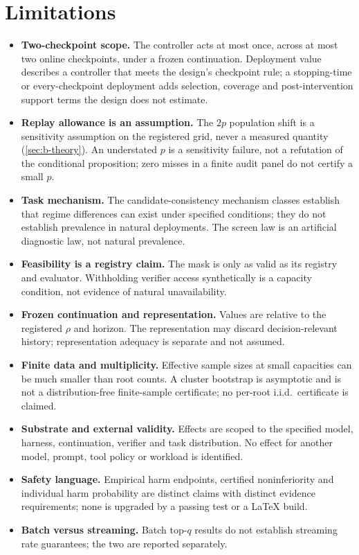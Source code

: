 \section{Limitations}
\label{sec:b-limitations}

\begin{itemize}[leftmargin=1.4em]
\item \textbf{Two-checkpoint scope.} The controller acts at most once, across at
  most two online checkpoints, under a frozen continuation.  Deployment value
  describes a controller that meets the design's checkpoint rule; a stopping-time
  or every-checkpoint deployment adds selection, coverage and post-intervention
  support terms the design does not estimate.
\item \textbf{Replay allowance is an assumption.} The $2p$ population shift is a
  sensitivity assumption on the registered grid, never a measured quantity
  (\cref{sec:b-theory}).  An understated $p$ is a sensitivity failure, not a
  refutation of the conditional proposition; zero misses in a finite audit panel
  do not certify a small $p$.
\item \textbf{Task mechanism.} The candidate-consistency mechanism classes
  establish that regime differences can exist under specified conditions; they do
  not establish prevalence in natural deployments.  The screen law is an
  artificial diagnostic law, not natural prevalence.
\item \textbf{Feasibility is a registry claim.} The mask is only as valid as its
  registry and evaluator.  Withholding verifier access synthetically is a
  capacity condition, not evidence of natural unavailability.
\item \textbf{Frozen continuation and representation.} Values are relative to the
  registered $\rho$ and horizon.  The representation may discard decision-relevant
  history; representation adequacy is separate and not assumed.
\item \textbf{Finite data and multiplicity.} Effective sample sizes at small
  capacities can be much smaller than root counts.  A cluster bootstrap is
  asymptotic and is not a distribution-free finite-sample certificate; no
  per-root i.i.d.\ certificate is claimed.
\item \textbf{Substrate and external validity.} Effects are scoped to the
  specified model, harness, continuation, verifier and task distribution.  No
  effect for another model, prompt, tool policy or workload is identified.
\item \textbf{Safety language.} Empirical harm endpoints, certified
  noninferiority and individual harm probability are distinct claims with
  distinct evidence requirements; none is upgraded by a passing test or a LaTeX
  build.
\item \textbf{Batch versus streaming.} Batch top-$q$ results do not establish
  streaming rate guarantees; the two are reported separately.
\end{itemize}
